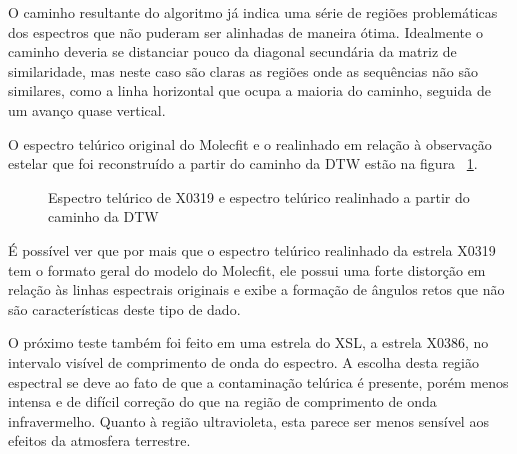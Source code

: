O caminho resultante do algoritmo já indica uma série de regiões problemáticas dos espectros que não puderam ser alinhadas de maneira ótima. Idealmente o caminho deveria se distanciar pouco da diagonal secundária da matriz de similaridade, mas neste caso são claras as regiões onde as sequências não são similares, como a linha horizontal que ocupa a maioria do caminho, seguida de um avanço quase vertical.

O espectro telúrico original do Molecfit e o realinhado em relação à observação estelar que foi reconstruído a partir do caminho da DTW estão na figura~ \ref{fig:x0319-realigned-telluric}.

\begin{figure}[htb]
  \centering
  \hfill
  \caption{Espectro telúrico de X0319 e espectro telúrico realinhado a partir do caminho da DTW}
  \label{fig:x0319-realigned-telluric}
\end{figure}

É possível ver que por mais que o espectro telúrico realinhado da estrela X0319 tem o formato geral do modelo do Molecfit, ele possui uma forte distorção em relação às linhas espectrais originais e exibe a formação de ângulos retos que não são características deste tipo de dado.

O próximo teste também foi feito em uma estrela do XSL, a estrela X0386, no intervalo visível de comprimento de onda do espectro. A escolha desta região espectral se deve ao fato de que a contaminação telúrica é presente, porém menos intensa e de difícil correção do que na região de comprimento de onda infravermelho. Quanto à região ultravioleta, esta parece ser menos sensível aos efeitos da atmosfera terrestre. 

